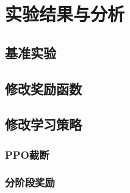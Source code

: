 \section{实验结果与分析}

\subsection{基准实验}

\subsection{修改奖励函数}

\subsection{修改学习策略}
\subsubsection{PPO截断}
\subsubsection{分阶段奖励}
